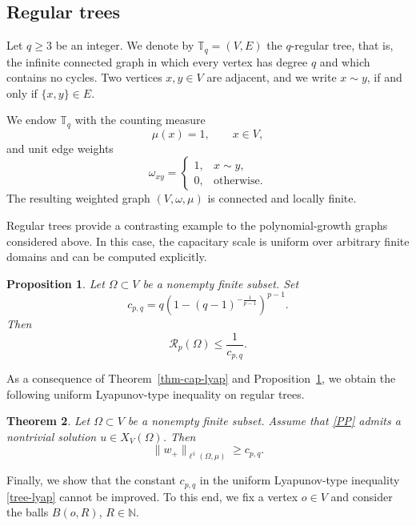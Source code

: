 \documentclass[twoside,12pt,letter]{article}
\theoremstyle{plain}
\newtheorem{theorem}{Theorem}[section]
\newtheorem{proposition}[theorem]{Proposition}
\theoremstyle{definition}
\theoremstyle{remark}
\numberwithin{equation}{section}
\begin{document}
\subsection{Regular trees}\label{subs-trees}


Let \(q\ge 3\) be an integer. We denote by \(\mathbb{T}_q=(V,E)\) the
\(q\)-regular tree, that is, the infinite connected graph in which every vertex
has degree \(q\) and which contains no cycles. Two vertices \(x,y\in V\) are
adjacent, and we write \(x\sim y\), if and only if \(\{x,y\}\in E\).

We endow \(\mathbb{T}_q\) with the counting measure
\[
\mu(x)=1,\qquad x\in V,
\]
and unit edge weights
\[
\omega_{xy}=
\begin{cases}
1, & x\sim y,\\
0, & \text{otherwise}.
\end{cases}
\]
The resulting weighted graph \((V,\omega,\mu)\) is connected and locally
finite.

Regular trees provide a contrasting example to the polynomial-growth graphs
considered above. In this case, the capacitary scale is uniform over arbitrary
finite domains and can be computed explicitly.

\begin{proposition}\label{prop-tree-cap}
Let \(\Omega\subset V\) be a nonempty finite subset. Set
\[
c_{p,q}
=
q\left(1-(q-1)^{-\frac{1}{p-1}}\right)^{p-1}.
\]
Then
\begin{equation}\label{cap-RT}
\mathcal{R}_p(\Omega)\le \frac{1}{c_{p,q}}.
\end{equation}
\end{proposition}

As a consequence of Theorem~\ref{thm-cap-lyap} and
Proposition~\ref{prop-tree-cap}, we obtain the following uniform
Lyapunov-type inequality on regular trees.

\begin{theorem}\label{thm-tree-lyap}
Let \(\Omega\subset V\) be a nonempty finite subset. Assume that \eqref{PP}
admits a nontrivial solution \(u\in X_V(\Omega)\). Then
\begin{equation}\label{tree-lyap}
\|w_+\|_{\ell^1(\Omega,\mu)}
\ge c_{p,q}.
\end{equation}
\end{theorem}

Finally, we show that the constant \(c_{p,q}\) in the uniform Lyapunov-type
inequality \eqref{tree-lyap} cannot be improved. To this end, we fix a vertex
\(o\in V\) and consider the balls \(B(o,R)\), \(R\in\mathbb{N}\).
\end{document}
